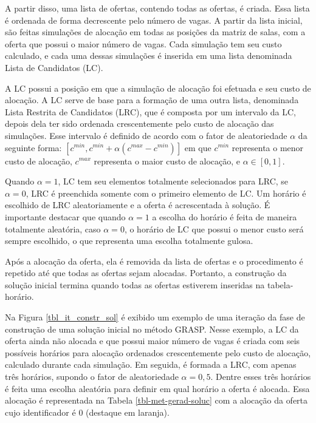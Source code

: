 A partir disso, uma lista de ofertas, contendo todas as ofertas, é criada. Essa lista é ordenada de forma decrescente pelo número de vagas. A partir da lista inicial, são feitas simulações de alocação em todas as posições da matriz de salas, com a oferta que possui o maior número de vagas. Cada simulação tem seu custo calculado, e cada uma dessas simulações é inserida em uma lista denominada Lista de Candidatos (LC).

A LC possui a posição em que a simulação de alocação foi efetuada e seu custo de alocação. A LC serve de base para a formação de uma outra lista, denominada Lista Restrita de Candidatos (LRC), que é composta por um intervalo da LC, depois dela ter sido ordenada crescentemente pelo custo de alocação das simulações. Esse intervalo é definido de acordo com o fator de aleatoriedade \(\alpha\) da seguinte forma: \([ c^{min}, c^{min} + \alpha(c^{max} - c^{min})]\) em que \(c^{min}\) representa o menor custo de alocação, \(c^{max}\) representa o maior custo de alocação, e \(\alpha \in [0,1]\).

Quando \(\alpha = 1\), LC tem seu elementos totalmente selecionados para LRC, se \(\alpha = 0\), LRC é preenchida somente com o primeiro elemento de LC. Um horário é escolhido de LRC aleatoriamente e a oferta é acrescentada à solução. É importante destacar que quando \(\alpha = 1\) a escolha do horário é feita de maneira totalmente aleatória, caso \(\alpha = 0\), o horário de LC que possui o menor custo será sempre escolhido, o que representa uma escolha totalmente gulosa.

Após a alocação da oferta, ela é removida da lista de ofertas e o procedimento é repetido até que todas as ofertas sejam alocadas. Portanto, a construção da solução inicial termina quando todas as ofertas estiverem inseridas na tabela-horário.

Na Figura \ref{tbl_it_constr_sol} é exibido um exemplo de uma iteração da fase de construção de uma solução inicial no método GRASP. Nesse exemplo, a LC da oferta ainda não alocada e que possui maior número de vagas é criada com seis possíveis horários para alocação ordenados crescentemente pelo custo de alocação, calculado durante cada simulação. Em seguida, é formada a LRC, com apenas três horários, supondo o fator de aleatoriedade \(\alpha = 0,5\). Dentre esses três horários é feita uma escolha aleatória para definir em qual horário a oferta é alocada. Essa alocação é representada na Tabela \ref{tbl-met-gerad-soluc} com a alocação da oferta cujo identificador é 0 (destaque em laranja).

